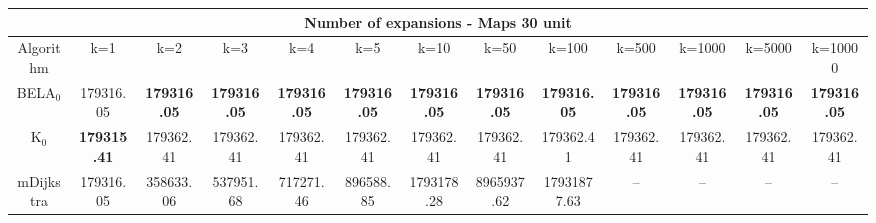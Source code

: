 \begin{tabular}{c|cccccccccccc}\toprule
\multicolumn{13}{c}{Number of expansions - Maps 30 unit}\\ \midrule
Algorithm & k=1 & k=2 & k=3 & k=4 & k=5 & k=10 & k=50 & k=100 & k=500 & k=1000 & k=5000 & k=10000 \\ \midrule
BELA$_0$ & 179316.05 & \textbf{179316.05} & \textbf{179316.05} & \textbf{179316.05} & \textbf{179316.05} & \textbf{179316.05} & \textbf{179316.05} & \textbf{179316.05} & \textbf{179316.05} & \textbf{179316.05} & \textbf{179316.05} & \textbf{179316.05} \\
K$_0$ & \textbf{179315.41} & 179362.41 & 179362.41 & 179362.41 & 179362.41 & 179362.41 & 179362.41 & 179362.41 & 179362.41 & 179362.41 & 179362.41 & 179362.41 \\
mDijkstra & 179316.05 & 358633.06 & 537951.68 & 717271.46 & 896588.85 & 1793178.28 & 8965937.62 & 17931877.63 & -- & -- & -- & -- \\ \bottomrule 
\end{tabular}
